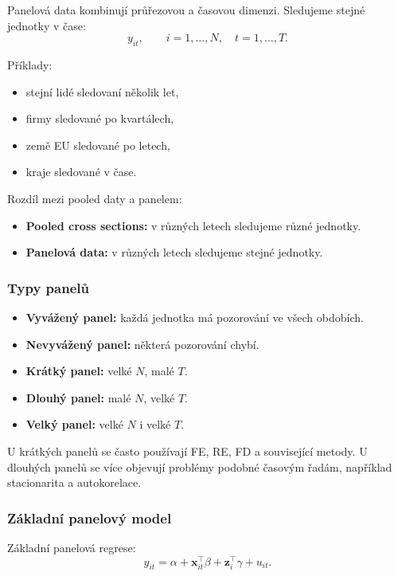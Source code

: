 Panelová data kombinují průřezovou a časovou dimenzi. Sledujeme stejné jednotky v čase:
\[
    y_{it},\qquad i=1,\dots,N,\quad t=1,\dots,T.
\]

Příklady:
\begin{itemize}
    \item stejní lidé sledovaní několik let,
    \item firmy sledované po kvartálech,
    \item země EU sledované po letech,
    \item kraje sledované v čase.
\end{itemize}

Rozdíl mezi pooled daty a panelem:
\begin{itemize}
    \item \textbf{Pooled cross sections:} v různých letech sledujeme různé jednotky.
    \item \textbf{Panelová data:} v různých letech sledujeme stejné jednotky.
\end{itemize}

\subsubsection{Typy panelů}

\begin{itemize}
    \item \textbf{Vyvážený panel:} každá jednotka má pozorování ve všech obdobích.
    \item \textbf{Nevyvážený panel:} některá pozorování chybí.
    \item \textbf{Krátký panel:} velké $N$, malé $T$.
    \item \textbf{Dlouhý panel:} malé $N$, velké $T$.
    \item \textbf{Velký panel:} velké $N$ i velké $T$.
\end{itemize}

U krátkých panelů se často používají FE, RE, FD a související metody. U dlouhých panelů se více
objevují problémy podobné časovým řadám, například stacionarita a autokorelace.

\subsubsection{Základní panelový model}

Základní panelová regrese:
\[
    y_{it}
    =
    \alpha
    +
    \mathbf x_{it}^\top\beta
    +
    \mathbf z_i^\top\gamma
    +
    u_{it}.
\]

